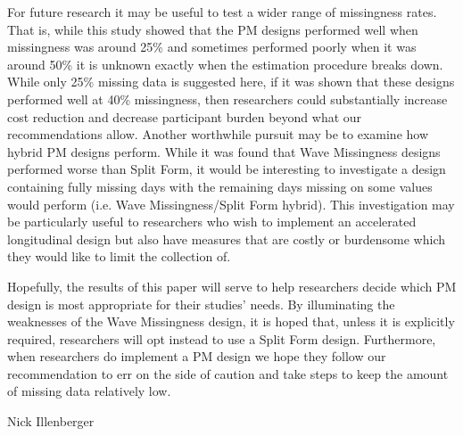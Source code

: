 \documentclass{svjour3}\usepackage[]{graphicx}\usepackage[]{color}
\begin{document}
For future research it may be useful to test a wider range of missingness rates. That is, while this study showed that the PM designs performed well when missingness was around 25\% and sometimes performed poorly when it was around 50\% it is unknown exactly when the estimation procedure breaks down. While only 25\% missing data is suggested here, if it was shown that these designs performed well at 40\% missingness, then researchers could substantially increase cost reduction and decrease participant burden beyond what our recommendations allow. Another worthwhile pursuit may be to examine how hybrid PM designs perform. While it was found that Wave Missingness designs performed worse than Split Form, it would be interesting to investigate a design containing fully missing days with the remaining days missing on some values would perform (i.e. Wave Missingness/Split Form hybrid). This investigation may be particularly useful to researchers who wish to implement an accelerated longitudinal design but also have measures that are costly or burdensome which they would like to limit the collection of. \par


Hopefully, the results of this paper will serve to help researchers decide which PM design is most appropriate for their studies' needs. By illuminating the weaknesses of the Wave Missingness design, it is hoped that, unless it is explicitly required, researchers will opt instead to use a Split Form design. Furthermore, when researchers do implement a PM design we hope they follow our recommendation to err on the side of caution and take steps to keep the amount of missing data relatively low. \par


\begin{acknowledgements}
Nick Illenberger
\end{acknowledgements}


\end{document}
